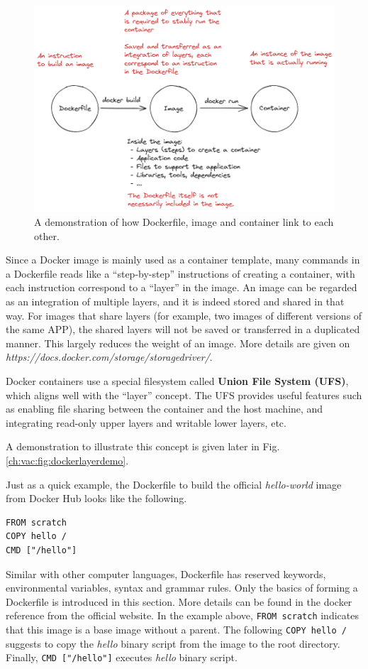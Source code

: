 \begin{figure}
	\centering
	\includegraphics[width=350pt]{chapters/ch-virtualization-and-containerization/figures/dockerfiletoimage.png}
	\caption{A demonstration of how Dockerfile, image and container link to each other.} \label{ch:vac:fig:dockerfiletoimage}
\end{figure}

Since a Docker image is mainly used as a container template, many commands in a Dockerfile reads like a ``step-by-step'' instructions of creating a container, with each instruction correspond to a ``layer'' in the image. An image can be regarded as an integration of multiple layers, and it is indeed stored and shared in that way. For images that share layers (for example, two images of different versions of the same APP), the shared layers will not be saved or transferred in a duplicated manner. This largely reduces the weight of an image. More details are given on \textit{https://docs.docker.com/storage/storagedriver/}.

Docker containers use a special filesystem called \textbf{Union File System (UFS)}, which aligns well with the ``layer'' concept. The UFS provides useful features such as enabling file sharing between the container and the host machine, and integrating read-only upper layers and writable lower layers, etc.

A demonstration to illustrate this concept is given later in Fig. \ref{ch:vac:fig:dockerlayerdemo}.


Just as a quick example, the Dockerfile to build the official \textit{hello-world} image from Docker Hub looks like the following.
\begin{lstlisting}
FROM scratch
COPY hello /
CMD ["/hello"]
\end{lstlisting}
Similar with other computer languages, Dockerfile has reserved keywords, environmental variables, syntax and grammar rules. Only the basics of forming a Dockerfile is introduced in this section. More details can be found in the docker reference from the official website. In the example above, \verb|FROM scratch| indicates that this image is a base image without a parent. The following \verb|COPY hello /| suggests to copy the \textit{hello} binary script from the image to the root directory. Finally, \verb|CMD ["/hello"]| executes \textit{hello} binary script.

